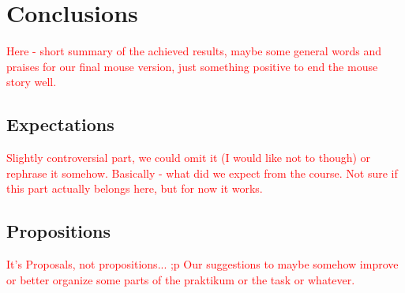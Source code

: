 \section{Conclusions}
\textcolor{red}{
Here - short summary of the achieved results, maybe some general words and praises for our final mouse version, just something positive to end the mouse story well.
}

\subsection{Expectations}
\textcolor{red}{
Slightly controversial part, we could omit it (I would like not to though) or rephrase it somehow. Basically - what did we expect from the course. Not sure if this part actually belongs here, but for now it works.
}
\subsection{Propositions}
\textcolor{red}{It's Proposals, not propositions... ;p}
\textcolor{red}{
Our suggestions to maybe somehow improve or better organize some parts of the praktikum or the task or whatever.
}

